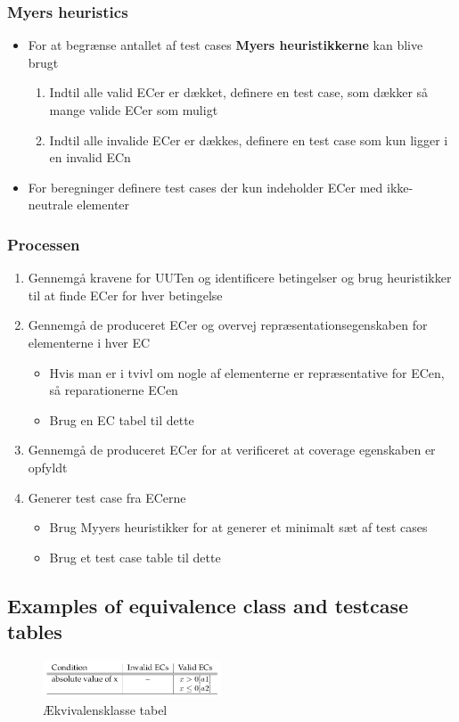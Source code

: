 \documentclass[a4, english]{article}
\begin{document}
\subsubsection{Myers heuristics}
\begin{itemize}
  \item For at begrænse antallet af test cases \textbf{Myers heuristikkerne} kan blive brugt
  \begin{enumerate}
  	\item Indtil alle valid ECer er dækket, definere en test case, som dækker så mange valide ECer som muligt
    \item Indtil alle invalide ECer er dækkes, definere en test case som kun ligger i en invalid ECn
  \end{enumerate}
  \item For beregninger definere test cases  der kun indeholder ECer med ikke-neutrale elementer
\end{itemize}

\subsubsection{Processen}
\begin{enumerate}
  \item Gennemgå kravene for UUTen og identificere betingelser og brug heuristikker til at finde ECer for hver betingelse
  \item Gennemgå de produceret ECer og overvej repræsentationsegenskaben for elementerne i hver EC
  \begin{itemize}
    \item Hvis man er i tvivl om nogle af elementerne er repræsentative for ECen, så reparationerne ECen
    \item Brug en EC tabel til dette
  \end{itemize}
  \item Gennemgå de produceret ECer for at verificeret at coverage egenskaben er opfyldt 
  \item Generer test case fra ECerne
  \begin{itemize}
    \item Brug Myyers heuristikker for at generer et minimalt sæt af test cases
    \item Brug et test case table til dette 
  \end{itemize}
\end{enumerate}

\subsection{Examples of equivalence class and testcase tables}
\begin{figure}[H]
	\centering
	\includegraphics[width=200px]{img/equivalence_table}
	\caption{Ækvivalensklasse tabel	\label{equivalenceClassTable}}
\end{figure}
\end{document}
